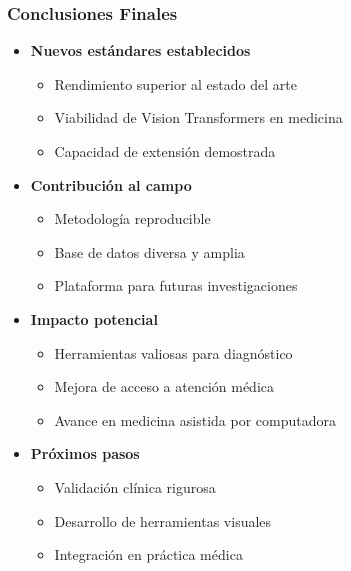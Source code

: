 \begin{frame}
\frametitle{Conclusiones Finales}
\begin{itemize}
    \item \textbf{Nuevos estándares establecidos}
    \begin{itemize}
        \item Rendimiento superior al estado del arte
        \item Viabilidad de Vision Transformers en medicina
        \item Capacidad de extensión demostrada
    \end{itemize}
    \item \textbf{Contribución al campo}
    \begin{itemize}
        \item Metodología reproducible
        \item Base de datos diversa y amplia
        \item Plataforma para futuras investigaciones
    \end{itemize}
    \item \textbf{Impacto potencial}
    \begin{itemize}
        \item Herramientas valiosas para diagnóstico
        \item Mejora de acceso a atención médica
        \item Avance en medicina asistida por computadora
    \end{itemize}
    \item \textbf{Próximos pasos}
    \begin{itemize}
        \item Validación clínica rigurosa
        \item Desarrollo de herramientas visuales
        \item Integración en práctica médica
    \end{itemize}
\end{itemize}
\end{frame}
